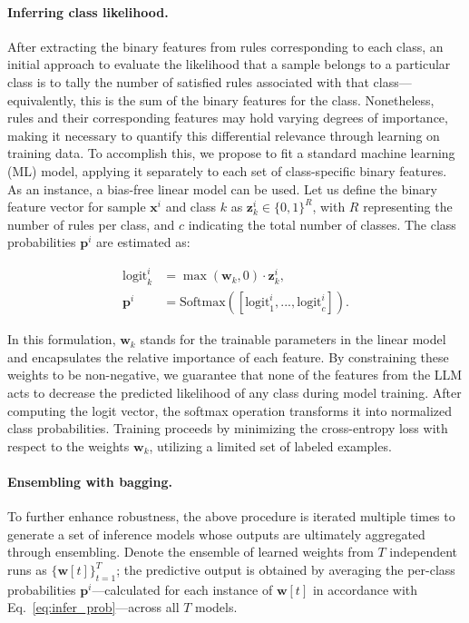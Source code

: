 \paragraph{Inferring class likelihood.} After extracting the binary features from rules corresponding to each class, an initial approach to evaluate the likelihood that a sample belongs to a particular class is to tally the number of satisfied rules associated with that class—equivalently, this is the sum of the binary features for the class. Nonetheless, rules and their corresponding features may hold varying degrees of importance, making it necessary to quantify this differential relevance through learning on training data. To accomplish this, we propose to fit a standard machine learning (ML) model, applying it separately to each set of class-specific binary features. As an instance, a bias-free linear model can be used. Let us define the binary feature vector for sample $\mathbf{x}^i$ and class $k$ as $\mathbf{z}_k^i \in \{0, 1\}^R$, with $R$ representing the number of rules per class, and $c$ indicating the total number of classes. The class probabilities $\mathbf{p}^i$ are estimated as:

\begin{align}
\text{logit}_k^i &= \max(\mathbf{w}_k, 0) \cdot \mathbf{z}_k^i, \nonumber \\
\mathbf{p}^i &= \text{Softmax}({[\text{logit}_{1}^i, ..., \text{logit}_{c}^i]}). \label{eq:infer_prob}
\end{align}

In this formulation, $\mathbf{w}_k$ stands for the trainable parameters in the linear model and encapsulates the relative importance of each feature. By constraining these weights to be non-negative, we guarantee that none of the features from the LLM acts to decrease the predicted likelihood of any class during model training. After computing the logit vector, the softmax operation transforms it into normalized class probabilities. Training proceeds by minimizing the cross-entropy loss with respect to the weights $\mathbf{w}_k$, utilizing a limited set of labeled examples.

\vspace*{-0.12in}
\paragraph{Ensembling with bagging.} To further enhance robustness, the above procedure is iterated multiple times to generate a set of inference models whose outputs are ultimately aggregated through ensembling. Denote the ensemble of learned weights from $T$ independent runs as $\{\mathbf{w}[t]\}_{t=1}^T$; the predictive output is obtained by averaging the per-class probabilities $\mathbf{p}^i$—calculated for each instance of $\mathbf{w}[t]$ in accordance with Eq.~\ref{eq:infer_prob}—across all $T$ models.

